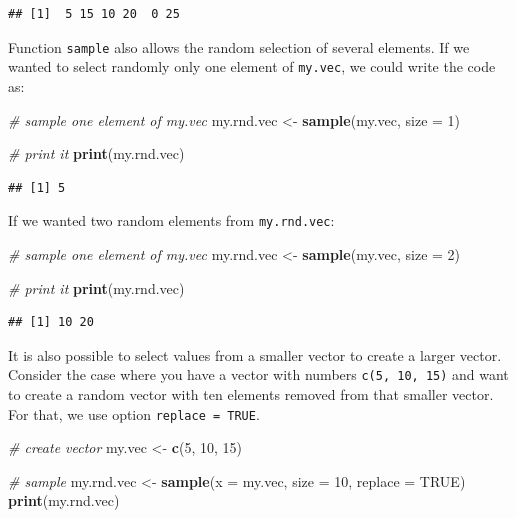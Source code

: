 \documentclass[11pt,]{book}
\newenvironment{Shaded}{\begin{snugshade}}{\end{snugshade}}
\newcommand{\KeywordTok}[1]{\textcolor[rgb]{0.27,0.27,0.27}{\textbf{#1}}}
\newcommand{\DataTypeTok}[1]{\textcolor[rgb]{0.27,0.27,0.27}{#1}}
\newcommand{\DecValTok}[1]{\textcolor[rgb]{0.06,0.06,0.06}{#1}}
\newcommand{\StringTok}[1]{\textcolor[rgb]{0.5,0.5,0.5}{#1}}
\newcommand{\CommentTok}[1]{\textcolor[rgb]{0.56,0.35,0.01}{\textit{#1}}}
\newcommand{\OtherTok}[1]{\textcolor[rgb]{0.56,0.35,0.01}{#1}}
\newcommand{\NormalTok}[1]{#1}
\begin{document}
\begin{verbatim}
## [1]  5 15 10 20  0 25
\end{verbatim}

Function \texttt{sample} also allows the random selection of several
elements. If we wanted to select randomly only one element of
\texttt{my.vec}, we could write the code as:

\begin{Shaded}
\begin{Highlighting}[]
\CommentTok{# sample one element of my.vec}
\NormalTok{my.rnd.vec <-}\StringTok{ }\KeywordTok{sample}\NormalTok{(my.vec, }\DataTypeTok{size =} \DecValTok{1}\NormalTok{)}

\CommentTok{# print it}
\KeywordTok{print}\NormalTok{(my.rnd.vec)}
\end{Highlighting}
\end{Shaded}

\begin{verbatim}
## [1] 5
\end{verbatim}

If we wanted two random elements from \texttt{my.rnd.vec}:

\begin{Shaded}
\begin{Highlighting}[]
\CommentTok{# sample one element of my.vec}
\NormalTok{my.rnd.vec <-}\StringTok{ }\KeywordTok{sample}\NormalTok{(my.vec, }\DataTypeTok{size =} \DecValTok{2}\NormalTok{)}

\CommentTok{# print it}
\KeywordTok{print}\NormalTok{(my.rnd.vec)}
\end{Highlighting}
\end{Shaded}

\begin{verbatim}
## [1] 10 20
\end{verbatim}

It is also possible to select values from a smaller vector to create a
larger vector. Consider the case where you have a vector with numbers
\texttt{c(5,\ 10,\ 15)} and want to create a random vector with ten
elements removed from that smaller vector. For that, we use option
\texttt{replace\ =\ TRUE}.

\begin{Shaded}
\begin{Highlighting}[]
\CommentTok{# create vector}
\NormalTok{my.vec <-}\StringTok{ }\KeywordTok{c}\NormalTok{(}\DecValTok{5}\NormalTok{, }\DecValTok{10}\NormalTok{, }\DecValTok{15}\NormalTok{)}

\CommentTok{# sample}
\NormalTok{my.rnd.vec <-}\StringTok{ }\KeywordTok{sample}\NormalTok{(}\DataTypeTok{x =}\NormalTok{ my.vec, }\DataTypeTok{size =} \DecValTok{10}\NormalTok{, }\DataTypeTok{replace =} \OtherTok{TRUE}\NormalTok{)}
\KeywordTok{print}\NormalTok{(my.rnd.vec)}
\end{Highlighting}
\end{Shaded}
\end{document}
